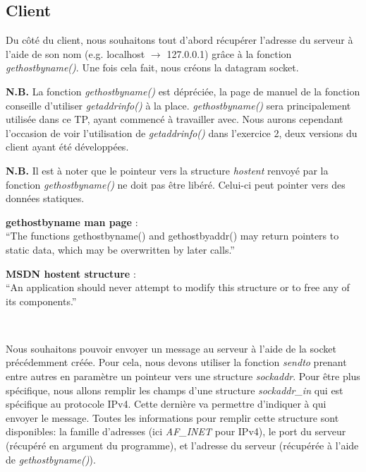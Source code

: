 \documentclass[a4paper, frenchb, 11pt]{article}
\begin{document}
\subsection{Client}
Du côté du client, nous souhaitons tout d'abord récupérer l'adresse du serveur à l'aide de son nom (e.g. localhost $\rightarrow$ 127.0.0.1) grâce à la fonction \emph{gethostbyname()}. Une fois cela fait, nous créons la datagram socket.\\

\begin{mdframed}[backgroundcolor=hintbg, linecolor=hintborder]
\noindent \textbf{N.B.} La fonction \emph{gethostbyname()} est dépréciée, la page de manuel de la fonction conseille d'utiliser \emph{getaddrinfo()} à la place. \emph{gethostbyname()} sera principalement utilisée dans ce TP, ayant commencé à travailler avec. Nous aurons cependant l'occasion de voir l'utilisation de \emph{getaddrinfo()} dans l'exercice 2, deux versions du client ayant été développées.
\end{mdframed}

\begin{mdframed}[backgroundcolor=lightblue2, linecolor=darkblue]
\noindent \textbf{N.B.} Il est à noter que le pointeur vers la structure \emph{hostent} renvoyé par la fonction \emph{gethostbyname()} ne doit pas être libéré. Celui-ci peut pointer vers des données statiques.

\begin{mdframed}[backgroundcolor=lightblue, linecolor=darkblue]
	\textbf{gethostbyname man page} :\\ %
	``The functions gethostbyname() and gethostbyaddr() may  return  pointers to  static  data, which may be overwritten by later calls.''
\end{mdframed}
\begin{mdframed}[backgroundcolor=lightblue, linecolor=darkblue]
	\noindent\textbf{MSDN hostent structure} :\\ %
	``An application should never attempt to modify this structure or to free any of its components.''
\end{mdframed}
\end{mdframed}
\

Nous souhaitons pouvoir envoyer un message au serveur à l'aide de la socket précédemment créée. Pour cela, nous devons utiliser la fonction \emph{sendto} prenant entre autres en paramètre un pointeur vers une structure \emph{sockaddr}. Pour être plus spécifique, nous allons remplir les champs d'une structure \emph{sockaddr\_in} qui est spécifique au protocole IPv4. Cette dernière va permettre d'indiquer à qui envoyer le message. Toutes les informations pour remplir cette structure sont disponibles: la famille d'adresses (ici \emph{AF\_INET} pour IPv4), le port du serveur (récupéré en argument du programme), et l'adresse du serveur (récupérée à l'aide de \emph{gethostbyname()}).
\end{document}
